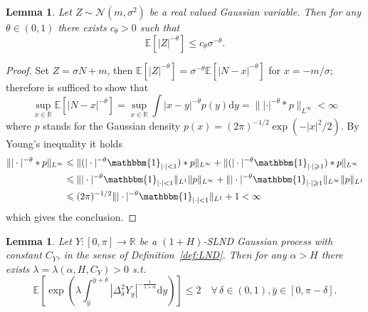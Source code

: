 \documentclass[11pt,oneside,reqno]{amsart}
\newcommand{\mathd}{\mathrm{d}}
\newtheorem{lemma}[theorem]{Lemma}
\numberwithin{equation}{section}
\begin{document}
\begin{lemma}
  \label{lem:gauss-lemma2}Let $Z \sim \mathcal{N} (m, \sigma^2)$ be a real
  valued Gaussian variable. Then for any $\theta \in (0, 1)$ there exists
  $c_{\theta} > 0$ such that
  \[ \mathbb{E} [| Z |^{- \theta}] \leqslant c_{\theta} \sigma^{- \theta} . \]
\end{lemma}

\begin{proof}
  Set $Z = \sigma N + m$, then $\mathbb{E} [| Z |^{- \theta}] = \sigma^{-
  \theta} \mathbb{E} [| N - x |^{- \theta}]$ for $x = - m / \sigma$; therefore
  is sufficed to show that
  \[ \sup_{x \in \mathbb{R}} \mathbb{E} [| N - x |^{- \theta} ] = \sup_{x \in
     \mathbb{R}} \int | x - y |^{- \theta} p (y) \mathd y = \| | \cdot |^{-
     \theta} \ast p \|_{L^{\infty}} < \infty \]
  where $p$ stands for the Gaussian density $p (x) = (2 \pi)^{- 1 / 2} \exp (-
  | x |^2 / 2)$. By Young's inequality it holds
%  
  \begin{align*}
    \| | \cdot |^{- \theta} \ast p \|_{L^{\infty}} & \leqslant \| (| \cdot
    |^{- \theta} \mathbbm{1}_{| \cdot | < 1}) \ast p \|_{L^{\infty}} + \| (|
    \cdot |^{- \theta} \mathbbm{1}_{| \cdot | \geqslant 1}) \ast p
    \|_{L^{\infty}}\\
    & \leqslant \| | \cdot |^{- \theta} \mathbbm{1}_{| \cdot | < 1} \|_{L^1}
    \| p \|_{L^{\infty}} + \| | \cdot |^{- \theta} \mathbbm{1}_{| \cdot |
    \geqslant 1} \|_{L^{\infty}}  \| p \|_{L^1}\\
    & \leqslant (2 \pi)^{- 1 / 2} \| | \cdot |^{- \theta} \mathbbm{1}_{|
    \cdot | < 1} \|_{L^1} + 1 < \infty
  \end{align*}
%  
  which gives the conclusion.
\end{proof}

\begin{lemma}
  \label{lem:gauss-lemma3}Let $Y : [0, \pi] \rightarrow \mathbb{R}$ be a $(1 +
  H)$-SLND Gaussian process with constant $C_Y$, in the sense of
  Definition~\ref{def:LND}. Then for any $\alpha > H$ there exists $\lambda =
  \lambda (\alpha, H, C_Y) > 0$ s.t.
  \[ \mathbb{E} \left[ \exp \left( \lambda \int_{\bar{y}}^{\bar{y} + \delta} |
     \Delta^2_{\delta} Y_y |^{- \frac{1}{1 + \alpha}} \mathd y \right) \right]
     \leqslant 2 \quad \forall \, \delta \in (0, 1), \bar{y} \in [0, \pi -
     \delta] . \]
\end{lemma}
\end{document}
